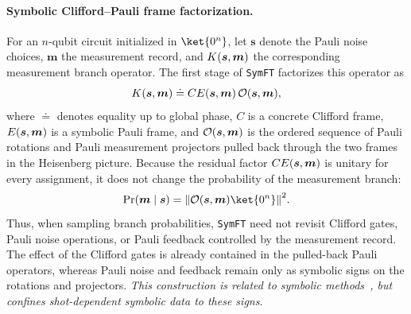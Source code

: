 \documentclass[a4paper,onecolumn,unpublished]{quantumarticle}
\DeclarePairedDelimiter\rbra{\lparen}{\rparen}
\DeclarePairedDelimiter\Abs{\lVert}{\rVert}
\newcommand{\tFont}[1]{\texttt{#1}}
\newcommand{\symft}{\tFont{SymFT}}
\newcommand{\cO}{\mathcal{O}}
\begin{document}
\paragraph{Symbolic Clifford--Pauli frame factorization.}
For an $n$-qubit circuit initialized in $\ket{0^n}$, let $\bm{s}$ denote the Pauli noise choices, $\bm{m}$ the measurement record, and $K\rbra{\bm{s},\bm{m}}$ the corresponding measurement branch operator.
The first stage of \symft{} factorizes this operator as
\begin{equation*}
    K\rbra{\bm{s},\bm{m}}
    \doteq
    C E\rbra{\bm{s},\bm{m}}\,
    \cO\rbra{\bm{s},\bm{m}},
\end{equation*}
where $\doteq$ denotes equality up to global phase, $C$ is a concrete Clifford frame, $E\rbra{\bm{s},\bm{m}}$ is a symbolic Pauli frame, and $\cO\rbra{\bm{s},\bm{m}}$ is the ordered sequence of Pauli rotations and Pauli measurement projectors pulled back through the two frames in the Heisenberg picture.
Because the residual factor $C E\rbra{\bm{s},\bm{m}}$ is unitary for every assignment, it does not change the probability of the measurement branch:
\begin{equation*}
    \Pr\rbra{\bm{m}\mid\bm{s}}
    = \Abs*{\cO\rbra{\bm{s},\bm{m}} \ket{0^n}}^2.
\end{equation*}
Thus, when sampling branch probabilities, \symft{} need not revisit Clifford gates, Pauli noise operations, or Pauli feedback controlled by the measurement record.
The effect of the Clifford gates is already contained in the pulled-back Pauli operators, whereas Pauli noise and feedback remain only as symbolic signs on the rotations and projectors.
\emph{This construction is related to symbolic methods~\cite{BSH+21,FY24a,FY24b,UA26}, but confines shot-dependent symbolic data to these signs}.
\end{document}
